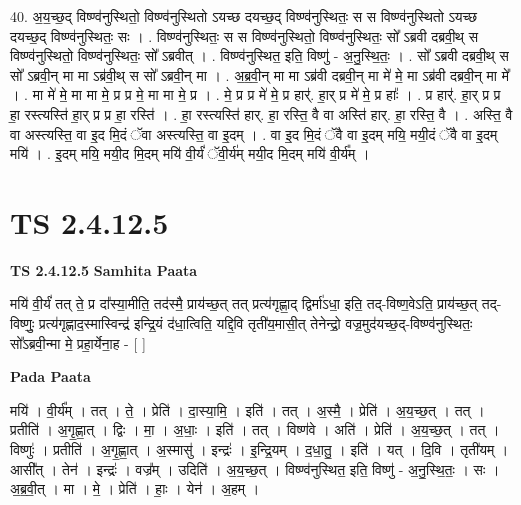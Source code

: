 \documentclass[17pt]{extarticle}
\begin{document}
40. अ॒य॒च्छ॒द् विष्ण्व॑नुस्थितो॒ विष्ण्व॑नुस्थितो ऽयच्छ दयच्छ॒द् विष्ण्व॑नुस्थितः॒ स स विष्ण्व॑नुस्थितो ऽयच्छ दयच्छ॒द् विष्ण्व॑नुस्थितः॒ सः । . विष्ण्व॑नुस्थितः॒ स स विष्ण्व॑नुस्थितो॒ विष्ण्व॑नुस्थितः॒ सो᳚ ऽब्रवी दब्रवी॒थ् स विष्ण्व॑नुस्थितो॒ विष्ण्व॑नुस्थितः॒ सो᳚ ऽब्रवीत् । . विष्ण्व॑नुस्थित॒ इति॒ विष्णु॑ - अ॒नु॒स्थि॒तः॒ । . सो᳚ ऽब्रवी दब्रवी॒थ् स सो᳚ ऽब्रवी॒न् मा मा ऽब्र॑वी॒थ् स सो᳚ ऽब्रवी॒न् मा । . अ॒ब्र॒वी॒न् मा मा ऽब्र॑वी दब्रवी॒न् मा मे॑ मे॒ मा ऽब्र॑वी दब्रवी॒न् मा मे᳚ । . मा मे॑ मे॒ मा मा मे॒ प्र प्र मे॒ मा मा मे॒ प्र । . मे॒ प्र प्र मे॑ मे॒ प्र हार्॑. हा॒र् प्र मे॑ मे॒ प्र हाः᳚ । . प्र हार्॑. हा॒र् प्र प्र हा॒ रस्त्यस्ति॑ हा॒र् प्र प्र हा॒ रस्ति॑ । . हा॒ रस्त्यस्ति॑ हार्. हा॒ रस्ति॒ वै वा अस्ति॑ हार्. हा॒ रस्ति॒ वै । . अस्ति॒ वै वा अस्त्यस्ति॒ वा इ॒द मि॒दं ॅवा अस्त्यस्ति॒ वा इ॒दम् । . वा इ॒द मि॒दं ॅवै वा इ॒दम् मयि॒ मयी॒दं ॅवै वा इ॒दम् मयि॑ । . इ॒दम् मयि॒ मयी॒द मि॒दम् मयि॑ वी॒र्यं॑ ॅवी॒र्य॑म् मयी॒द मि॒दम् मयि॑ वी॒र्य᳚म् । \newline
\pagebreak
{}

\section{ TS 2.4.12.5 }

\textbf{TS 2.4.12.5 } \newline
\textbf{Samhita Paata} \newline

मयि॑ वी॒र्यं॑ तत् ते॒ प्र दा᳚स्या॒मीति॒ तद॑स्मै॒ प्राय॑च्छ॒त् तत् प्रत्य॑गृह्णा॒द् द्विर्मा॑ऽधा॒ इति॒ तद्-विष्ण॒वेऽति॒ प्राय॑च्छ॒त् तद्-विष्णुः॒ प्रत्य॑गृह्णाद॒स्मास्विन्द्र॑ इन्द्रि॒यं द॑धा॒त्विति॒ यद्दि॒वि तृती॑य॒मासी॒त् तेनेन्द्रो॒ वज्र॒मुद॑यच्छ॒द्-विष्ण्व॑नुस्थितः॒ सो᳚ऽब्रवी॒न्मा मे॒ प्रहा॒र्येना॒ह - [  ] \newline

\textbf{Pada Paata} \newline

मयि॑ । वी॒र्य᳚म् । तत् । ते॒ । प्रेति॑ । दा॒स्या॒मि॒ । इति॑ । तत् । अ॒स्मै॒ । प्रेति॑ । अ॒य॒च्छ॒त् । तत् । प्रतीति॑ । अ॒गृ॒ह्णा॒त् । द्विः । मा॒ । अ॒धाः॒ । इति॑ । तत् । विष्ण॑वे । अति॑ । प्रेति॑ । अ॒य॒च्छ॒त् । तत् । विष्णुः॑ । प्रतीति॑ । अ॒गृ॒ह्णा॒त् । अ॒स्मासु॑ । इन्द्रः॑ । इ॒न्द्रि॒यम् । द॒धा॒तु॒ । इति॑ । यत् । दि॒वि । तृती॑यम् । आसी᳚त् । तेन॑ । इन्द्रः॑ । वज्र᳚म् । उदिति॑ । अ॒य॒च्छ॒त् । विष्ण्व॑नुस्थित॒ इति॒ विष्णु॑ - अ॒नु॒स्थि॒तः॒ । सः । अ॒ब्र॒वी॒त् । मा । मे॒ । प्रेति॑ । हाः॒ । येन॑ । अ॒हम् ।  \newline
\end{document}
